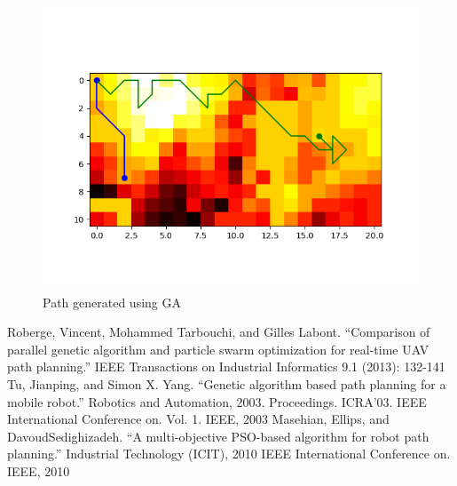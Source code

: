 \documentclass[conference]{IEEEtran}
\begin{document}
\begin{figure}[H]
\centerline{\includegraphics[scale=0.5]{performance/ga_2_drone}}
\caption{Path generated using GA}
\label{img:path_ga_2_drone}
\end{figure}

\newpage
\phantom{Blah}
\newpage

\begin{thebibliography}{00}
 Roberge, Vincent, Mohammed Tarbouchi, and Gilles Labont. ``Comparison of parallel genetic algorithm and particle swarm optimization for real-time UAV path planning.'' IEEE Transactions on Industrial Informatics 9.1 (2013): 132-141
 Tu, Jianping, and Simon X. Yang. ``Genetic algorithm based path planning for a mobile robot.'' Robotics and Automation, 2003. Proceedings. ICRA'03. IEEE International Conference on. Vol. 1. IEEE, 2003
 Masehian, Ellips, and DavoudSedighizadeh. ``A multi-objective PSO-based algorithm for robot path planning.'' Industrial Technology (ICIT), 2010 IEEE International Conference on. IEEE, 2010
\end{thebibliography}
\end{document}
